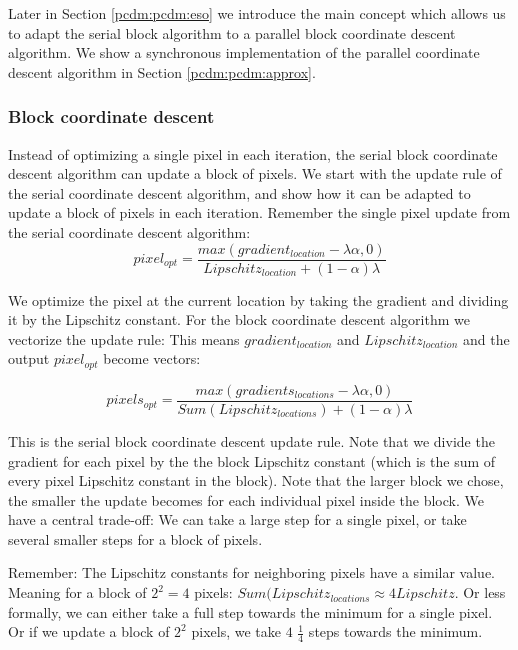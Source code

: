 Later in Section \ref{pcdm:pcdm:eso} we introduce the main concept which allows us to adapt the serial block algorithm to a parallel block coordinate descent algorithm. We show a synchronous implementation of the parallel coordinate descent algorithm in Section \ref{pcdm:pcdm:approx}.

\subsubsection{Block coordinate descent}
Instead of optimizing a single pixel in each iteration, the serial block coordinate descent algorithm can update a block of pixels. We start with the update rule of the serial coordinate descent algorithm, and show how it can be adapted to update a block of pixels in each iteration. Remember the single pixel update from the serial coordinate descent algorithm: 
\begin{equation} \label{pcdm:pcdm:block:single:update}
pixel_{opt} = \frac{max(gradient_{location} - \lambda\alpha, 0)}{Lipschitz_{location} + (1 - \alpha)\lambda}
\end{equation}

We optimize the pixel at the current location by taking the gradient and dividing it by the Lipschitz constant. For the block coordinate descent algorithm we vectorize the update rule: This means $gradient_{location}$ and $Lipschitz_{location}$ and the output $pixel_{opt}$ become vectors:

\begin{equation} \label{pcdm:pcdm:block:block:update}
pixels_{opt} = \frac{max(gradients_{locations} - \lambda\alpha, 0)}{Sum(Lipschitz_{locations}) + (1 - \alpha)\lambda}
\end{equation}

This is the serial block coordinate descent update rule. Note that we divide the gradient for each pixel by the the block Lipschitz constant (which is the sum of every pixel Lipschitz constant in the block). Note that the larger block we chose, the smaller the update becomes for each individual pixel inside the block. We have a central trade-off: We can take a large step for a single pixel, or take several smaller steps for a block of pixels. 

Remember: The Lipschitz constants for neighboring pixels have a similar value. Meaning for a block of $2^2 = 4$ pixels: $Sum(Lipschitz_{locations} \approx 4 Lipschitz$. Or less formally, we can either take a full step towards the minimum for a single pixel. Or if we update a block of $2^2$ pixels, we take $4$ $\frac{1}{4}$ steps towards the minimum.

